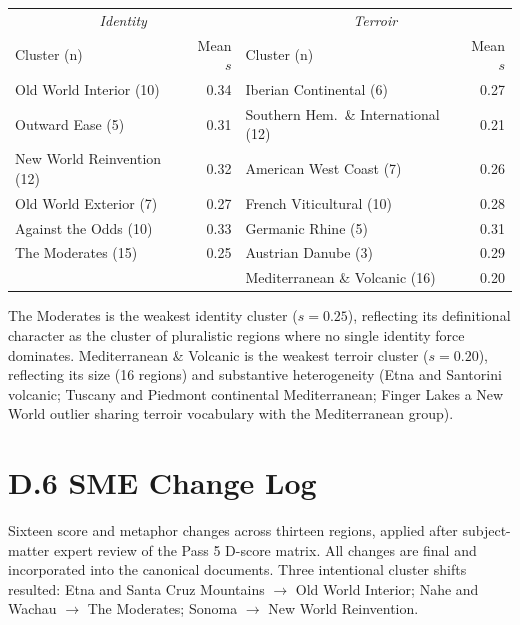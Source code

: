 \documentclass[11pt]{article}
\begin{document}
\begin{center}
\begin{tabular}{@{}lr|lr@{}}
\toprule
\multicolumn{2}{c|}{\textit{Identity}} & \multicolumn{2}{c}{\textit{Terroir}} \\
Cluster (n) & Mean $s$ & Cluster (n) & Mean $s$ \\
\midrule
Old World Interior (10)      & 0.34 & Iberian Continental (6)               & 0.27 \\
Outward Ease (5)             & 0.31 & Southern Hem.\ \& International (12) & 0.21 \\
New World Reinvention (12)   & 0.32 & American West Coast (7)               & 0.26 \\
Old World Exterior (7)       & 0.27 & French Viticultural (10)              & 0.28 \\
Against the Odds (10)        & 0.33 & Germanic Rhine (5)                    & 0.31 \\
The Moderates (15)           & 0.25 & Austrian Danube (3)                   & 0.29 \\
                             &      & Mediterranean \& Volcanic (16)        & 0.20 \\
\bottomrule
\end{tabular}
\end{center}

The Moderates is the weakest identity cluster ($s = 0.25$), reflecting its definitional character as the cluster of pluralistic regions where no single identity force dominates. Mediterranean \& Volcanic is the weakest terroir cluster ($s = 0.20$), reflecting its size (16 regions) and substantive heterogeneity (Etna and Santorini volcanic; Tuscany and Piedmont continental Mediterranean; Finger Lakes a New World outlier sharing terroir vocabulary with the Mediterranean group).

\section*{D.6 SME Change Log}
Sixteen score and metaphor changes across thirteen regions, applied after subject-matter expert review of the Pass 5 D-score matrix. All changes are final and incorporated into the canonical documents. Three intentional cluster shifts resulted: Etna and Santa Cruz Mountains $\rightarrow$ Old World Interior; Nahe and Wachau $\rightarrow$ The Moderates; Sonoma $\rightarrow$ New World Reinvention.
\end{document}
